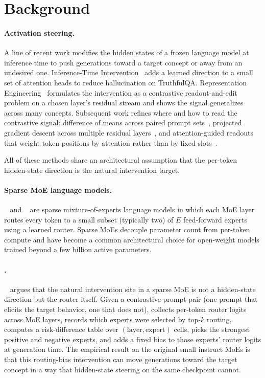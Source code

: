 \section{Background}
\label{sec:background}

\paragraph{Activation steering.}
A line of recent work modifies the hidden states of a frozen language model at
inference time to push generations toward a target concept or away from an
undesired one. Inference-Time Intervention~\citep{liu2024iti} adds a learned
direction to a small set of attention heads to reduce hallucination on
TruthfulQA. Representation Engineering~\citep{zou2023repe} formulates the
intervention as a contrastive readout-and-edit problem on a chosen layer's
residual stream and shows the signal generalizes across many concepts.
Subsequent work refines where and how to read the contrastive signal: difference
of means across paired prompt sets~\citep{li2024fewshot}, projected gradient
descent across multiple residual layers~\citep{turner2023acteng}, and
attention-guided readouts that weight token positions by attention rather than
by fixed slots~\citep{tan2024attentionguided}.

All of these methods share an architectural assumption that the per-token
hidden-state direction is the natural intervention target.

\paragraph{Sparse MoE language models.}
\mixtral~\citep{jiang2024mixtral} and \olmoe~\citep{muennighoff2024olmoe} are
sparse mixture-of-experts language models in which each MoE layer routes every
token to a small subset (typically two) of $E$ feed-forward experts using a
learned router. Sparse MoEs decouple parameter count from per-token compute
and have become a common architectural choice for open-weight models trained
beyond a few billion active parameters.

\paragraph{\steermoe.}
\steermoe~\citep{wang2024steermoe} argues that the natural intervention site in
a sparse MoE is not a hidden-state direction but the router itself. Given a
contrastive prompt pair (one prompt that elicits the target behavior, one that
does not), \steermoe collects per-token router logits across MoE layers,
records which experts were selected by top-$k$ routing, computes a
risk-difference table over $(\text{layer}, \text{expert})$ cells, picks the
strongest positive and negative experts, and adds a fixed bias to those
experts' router logits at generation time. The empirical result on the original
small instruct MoEs is that this routing-bias intervention can move generations
toward the target concept in a way that hidden-state steering on the same
checkpoint cannot.

